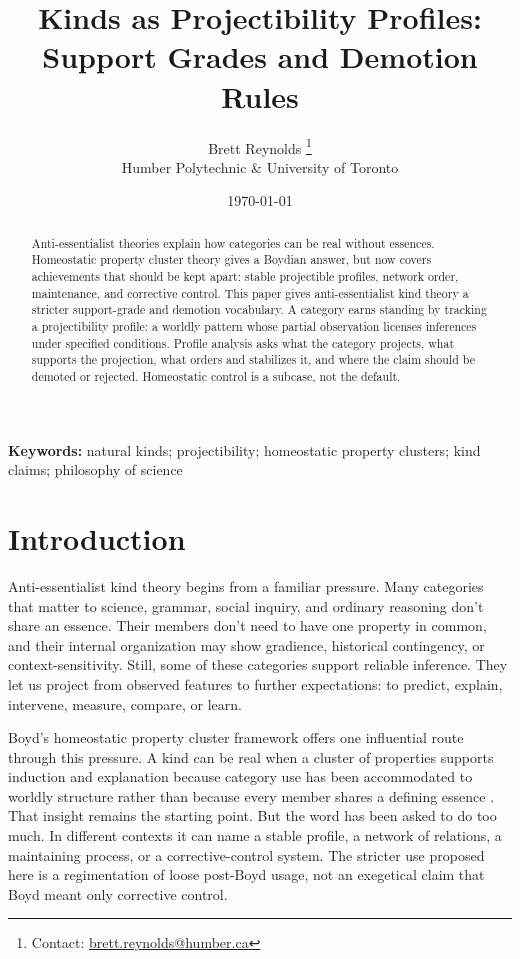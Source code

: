 \documentclass[12pt]{article}
\title{Kinds as Projectibility Profiles:\\Support Grades and Demotion Rules}
\author{Brett Reynolds \orcidlink{0000-0003-0073-7195}%
\thanks{Contact: \href{mailto:brett.reynolds@humber.ca}{brett.reynolds@humber.ca}}\\
Humber Polytechnic \& University of Toronto}
\date{\today}
\begin{document}
\maketitle

\begin{abstract}
Anti-essentialist theories explain how categories can be real without essences.
Homeostatic property cluster theory gives a Boydian answer, but
 now covers achievements that should be kept apart: stable
projectible profiles, network order, maintenance, and corrective control. This
paper gives anti-essentialist kind theory a stricter support-grade and demotion
vocabulary. A
category earns standing by tracking a projectibility profile: a worldly pattern
whose partial observation licenses inferences under specified conditions.
Profile analysis asks what the category projects, what supports the projection,
what orders and stabilizes it, and where the claim should be demoted or rejected.
Homeostatic control is a subcase, not the default.
\end{abstract}

\noindent\textbf{Keywords:} natural kinds; projectibility; homeostatic property clusters; kind claims; philosophy of science

\section{Introduction}

Anti-essentialist kind theory begins from a familiar pressure. Many categories
that matter to science, grammar, social inquiry, and ordinary reasoning don't
share an essence. Their members don't need to have one property in common, and
their internal organization may show gradience, historical contingency, or
context-sensitivity.
Still, some of these categories support reliable inference. They let us project
from observed features to further expectations: to predict, explain, intervene,
measure, compare, or learn.

Boyd's homeostatic property cluster framework offers one influential route
through this pressure.
A kind can be real when a cluster of properties supports induction and
explanation because category use has been accommodated to worldly structure
rather than because every member shares a defining essence
\citep{boyd1991,boyd1999}. That insight remains the starting point. But the word
 has been asked to do too much. In different contexts it can
name a stable profile, a network of relations, a maintaining process, or a
corrective-control system. The stricter use proposed here is a regimentation of
loose post-Boyd usage, not an exegetical claim that Boyd meant only corrective
control.
\end{document}
